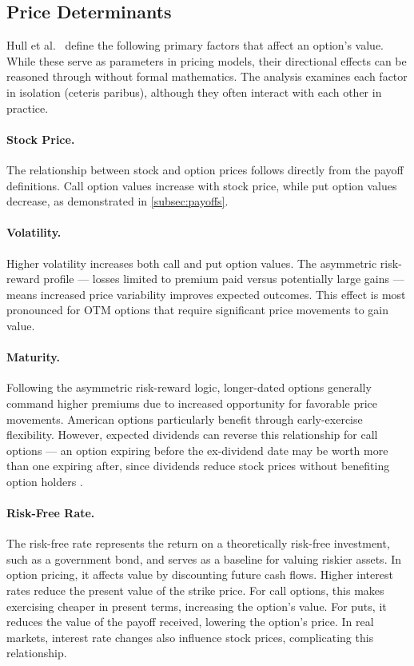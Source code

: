 \documentclass[english,12pt,a4paper,pdftex,sci,utf8]{aaltothesis}
\begin{document}
\subsection{Price Determinants}

Hull et al.\ \cite{hull2013fundamentals} define the following primary factors that affect an option's value. While these serve as parameters in pricing models, their directional effects can be reasoned through without formal mathematics. The analysis examines each factor in isolation (ceteris paribus), although they often interact with each other in practice.

\paragraph{Stock Price.} The relationship between stock and option prices follows directly from the payoff definitions. Call option values increase with stock price, while put option values decrease, as demonstrated in \cref{subsec:payoffs}.

\paragraph{Volatility.} Higher volatility increases both call and put option values. The asymmetric risk-reward profile --- losses limited to premium paid versus potentially large gains --- means increased price variability improves expected outcomes. This effect is most pronounced for OTM options that require significant price movements to gain value.

\paragraph{Maturity.} Following the asymmetric risk-reward logic, longer-dated options generally command higher premiums due to increased opportunity for favorable price movements. American options particularly benefit through early-exercise flexibility. However, expected dividends can reverse this relationship for call options --- an option expiring before the ex-dividend date may be worth more than one expiring after, since dividends reduce stock prices without benefiting option holders \cite{hull2013fundamentals}.

\paragraph{Risk-Free Rate.} The risk-free rate represents the return on a theoretically risk-free investment, such as a government bond, and serves as a baseline for valuing riskier assets. In option pricing, it affects value by discounting future cash flows. Higher interest rates reduce the present value of the strike price. For call options, this makes exercising cheaper in present terms, increasing the option’s value. For puts, it reduces the value of the payoff received, lowering the option’s price. In real markets, interest rate changes also influence stock prices, complicating this relationship.
\end{document}
